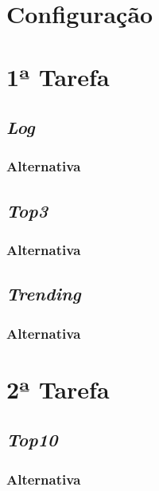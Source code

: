 \documentclass[a4paper]{report}
\begin{document}
{    \section{Configuração} \label{sec:Configuration}
    
	\section{1ª Tarefa} \label{sec:Task1}
		\subsection{\textit{Log}} \label{subsec:Task1-Log}
			\subsubsection{Alternativa} \label{sssec:Task1-Log-Alternativa}

		\subsection{\textit{Top3}} \label{subsec:Task1-Top3}
			\subsubsection{Alternativa} \label{sssec:Task1-Top3-Alternativa} 

		\subsection{\textit{Trending}} \label{subsec:Task1-Trending}
			\subsubsection{Alternativa} \label{sssec:Task1-Trending-Alternativa}

	\section{2ª Tarefa} \label{sec:Task2}
	\subsection{\textit{Top10}} \label{subsec:Task2-Top10}
		\subsubsection{Alternativa} \label{sssec:Task2-Top10-Alternativa}

}
\end{document}
